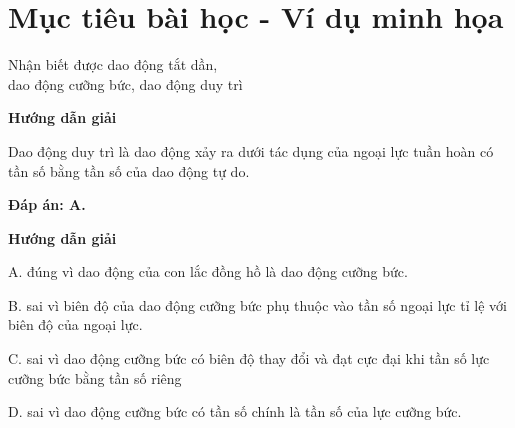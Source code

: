 \section{Mục tiêu bài học - Ví dụ minh họa}
\begin{dang}{Nhận biết được dao động tắt dần,\\ dao động cưỡng bức, dao động duy trì}
	{\begin{center}
			\textbf{Hướng dẫn giải}
		\end{center}
		
		Dao động duy trì là dao động xảy  ra dưới tác dụng của ngoại lực tuần hoàn có tần số bằng tần số của dao động tự do.
		
		\textbf{Đáp án: A.}
	}
	{\begin{center}
			\textbf{Hướng dẫn giải}
		\end{center}
		
		A. đúng vì dao động của con lắc đồng hồ là dao động cưỡng bức.
		
		B. sai vì biên độ của dao động cưỡng bức phụ thuộc vào tần số ngoại lực tỉ lệ với biên độ của ngoại lực.
		
		C. sai vì dao động cưỡng bức có biên độ thay đổi và đạt cực đại khi tần số lực cưỡng bức bằng tần số riêng
		
		D. sai vì dao động cưỡng bức có tần số chính là tần số của lực cưỡng bức.
		
}
\end{dang}
